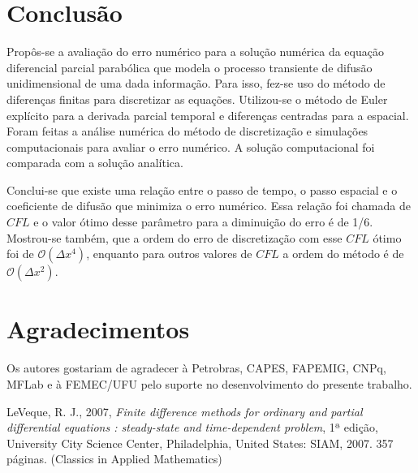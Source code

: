 \documentclass[10pt,twoside,a4paper]{article}
\begin{document}
\section{Conclusão} %
Propôs-se a avaliação do erro numérico para a solução numérica da equação diferencial parcial parabólica que modela o
processo transiente de difusão unidimensional de uma dada informação. Para isso, fez-se uso do método de diferenças finitas para discretizar as equações. Utilizou-se o método de Euler explícito para a derivada parcial temporal e diferenças centradas para a espacial. Foram feitas a análise numérica do método de discretização e simulações computacionais para avaliar o erro numérico. A solução computacional foi comparada com a solução analítica.

Conclui-se que existe uma relação entre o passo de tempo, o passo espacial e o coeficiente de difusão que minimiza o erro numérico. Essa relação foi chamada de $CFL$ e o valor ótimo desse parâmetro para a diminuição do erro é de 1/6. Mostrou-se também, que a ordem do erro de discretização com esse $CFL$ ótimo foi de $\mathcal{O}(\Delta x^4)$, enquanto para outros valores de $CFL$ a ordem do método é de $\mathcal{O}(\Delta x^2)$.


\section{Agradecimentos} %

Os autores gostariam de agradecer à Petrobras, CAPES, FAPEMIG, CNPq, MFLab e à FEMEC/UFU pelo suporte no desenvolvimento do presente trabalho. 


\begin{thebibliography}{9} %

	LeVeque, R. J.,
	2007,
	\emph{Finite difference methods for ordinary and partial differential equations : steady-state and
		time-dependent problem},
	1ª edição,
	University City Science Center, Philadelphia, United States:
	SIAM, 2007. 357 páginas. (Classics in Applied Mathematics)
\end{thebibliography}

\end{document}
